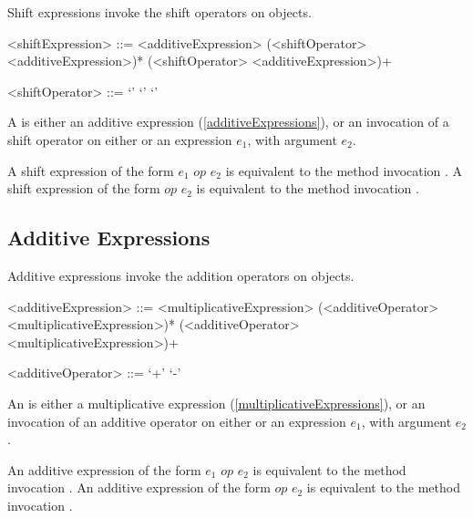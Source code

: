 \documentclass[makeidx]{article}
\begin{document}
{\LMHash{}%
Shift expressions invoke the shift operators on objects.

\begin{grammar}
<shiftExpression> ::= \gnewline{}
  <additiveExpression> (<shiftOperator> <additiveExpression>)*
  \alt \SUPER{} (<shiftOperator> <additiveExpression>)+

<shiftOperator> ::= `\ltlt'
  \alt `\gtgtgt'
  \alt `\gtgt'
\end{grammar}

\LMHash{}%
A  is either an additive expression
(\ref{additiveExpressions}),
or an invocation of a shift operator
on either \SUPER{} or an expression $e_1$,
with argument $e_2$.

\LMHash{}%
A shift expression of the form $e_1$ $op$ $e_2$ is equivalent to
the method invocation .
A shift expression of the form \SUPER{} $op$ $e_2$ is equivalent to
the method invocation .



\subsection{Additive Expressions}

\LMHash{}%
Additive expressions invoke the addition operators on objects.

\begin{grammar}
<additiveExpression> ::= <multiplicativeExpression>
  \gnewline{} (<additiveOperator> <multiplicativeExpression>)*
  \alt \SUPER{} (<additiveOperator> <multiplicativeExpression>)+

<additiveOperator> ::= `+'
  \alt `-'
\end{grammar}

\LMHash{}%
An  is either a multiplicative expression
(\ref{multiplicativeExpressions}),
or an invocation of an additive operator
on either \SUPER{} or an expression $e_1$,
with argument $e_2$.

\LMHash{}%
An additive expression of the form $e_1$ $op$ $e_2$ is equivalent to
the method invocation .
An additive expression of the form \SUPER{} $op$ $e_2$ is equivalent to
the method invocation .

}
\end{document}
